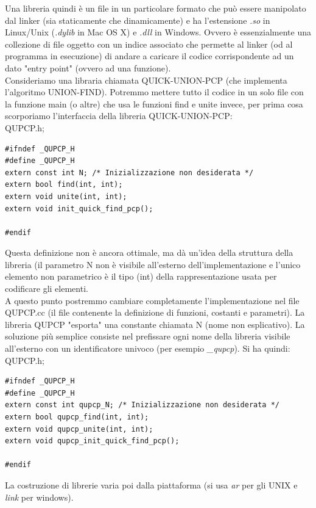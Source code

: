 \documentclass[a4paper,12pt, oneside]{book}
\begin{document}
Una libreria quindi è un file in un particolare formato che può essere manipolato dal
linker (sia staticamente che dinamicamente) e ha l'estensione \textit{.so} in Linux/Unix (\textit{.dylib} in Mac OS X) e \textit{.dll} in Windows. Ovvero è essenzialmente una collezione di file oggetto con
un indice associato che permette al linker (od al programma in esecuzione) di andare a caricare il codice corrispondente ad un dato "entry point" (ovvero ad una funzione).\\
Consideriamo una libraria chiamata QUICK-UNION-PCP (che
implementa l'algoritmo UNION-FIND). Potremmo mettere tutto il codice in un solo file con la funzione main (o
altre) che usa le funzioni find e unite invece, per prima cosa scorporiamo l'interfaccia della libreria
QUICK-UNION-PCP:\\
QUPCP.h;
\begin{verbatim}
#ifndef _QUPCP_H
#define _QUPCP_H
extern const int N; /* Inizializzazione non desiderata */
extern bool find(int, int);
extern void unite(int, int);
extern void init_quick_find_pcp();

#endif
\end{verbatim}
Questa definizione non è ancora ottimale, ma dà un'idea della
struttura della libreria (il parametro N non è visibile all'esterno dell'implementazione e l'unico elemento non parametrico è il tipo (int) della
rappresentazione usata per codificare gli elementi.\\
A questo punto postremmo cambiare completamente
l'implementazione nel file QUPCP.cc (il file contenente la
definizione di funzioni, costanti e parametri). La libreria QUPCP "esporta" una constante chiamata N (nome non esplicativo). La soluzione più semplice consiste nel prefissare ogni nome
della libreria visibile all'esterno con un identificatore univoco (per esempio \textit{\_qupcp}). Si ha quindi:
QUPCP.h;
\begin{verbatim}
#ifndef _QUPCP_H
#define _QUPCP_H
extern const int qupcp_N; /* Inizializzazione non desiderata */
extern bool qupcp_find(int, int);
extern void qupcp_unite(int, int);
extern void qupcp_init_quick_find_pcp();

#endif
\end{verbatim}
La costruzione di librerie varia poi dalla piattaforma (si usa \textit{ar} per gli UNIX e \textit{link} per windows).
\end{document}

